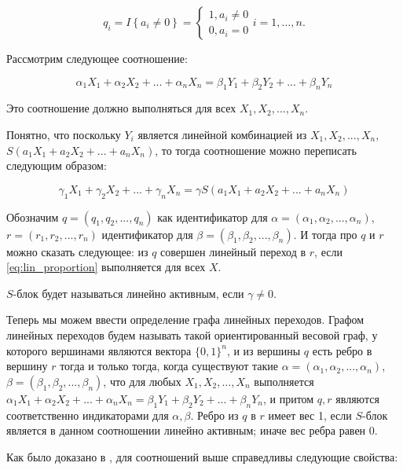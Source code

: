 \documentclass[a4paper,12pt]{report}
\theoremstyle{plain} %
\theoremstyle{definition}
\theoremstyle{remark}
\begin{document}
\begin{large}
\begin{equation}
q_i=I\left\{a_i\ne 0\right\}=\left\{ \begin{array}{c}
1,a_i \neq 0 \\
0,a_i = 0\end{array}
\right.i=1,\dots , n.
\end{equation}

Рассмотрим следующее соотношение:

\begin{equation}
\label{eq:lin_proportion}
\alpha_1X_1 + \alpha_2X_2 + ... + \alpha_nX_n = \beta_1Y_1 + \beta_2Y_2 + ... + \beta_nY_n
\end{equation}

Это соотношение должно выполняться для всех $X_1, X_2, ..., X_n$.

Понятно, что поскольку $Y_i$ является линейной комбинацией из $X_1, X_2, ..., X_n$, $S(a_1X_1 + a_2X_2 + ... + a_nX_n)$, то тогда соотношение можно переписать следующим образом:

\begin{equation}\label{eq:in_gamma}
\gamma_1X_1 + \gamma_2X_2 + ... + \gamma_nX_n = \gamma S(a_1X_1 + a_2X_2 + ... + a_nX_n)\end{equation}

Обозначим $q=(q_1, q_2, ..., q_n)$ как идентификатор для $\alpha=(\alpha_1, \alpha_2, ..., \alpha_n)$, $r=(r_1, r_2, ..., r_n)$ идентификатор для $\beta = (\beta_1, \beta_2, ..., \beta_n)$. И тогда про $q$ и $r$ можно сказать следующее: из $q$ совершен линейный переход в $r$, если \ref{eq:lin_proportion} выполняется для всех $X$. 

$S$-блок будет называться линейно активным, если $\gamma \neq 0$.

Теперь мы можем ввести определение графа линейных переходов. Графом линейных переходов будем называть такой ориентированный весовой граф, у которого вершинами являются вектора $\{0, 1\}^n$, и из вершины $q$ есть ребро в вершину $r$ тогда и только тогда, когда существуют такие $\alpha = (\alpha_1, \alpha_2, ..., \alpha_n)$, $\beta = (\beta_1, \beta_2, ..., \beta_n)$, что для любых $X_1, X_2, ..., X_n$ выполняется $\alpha_1X_1 + \alpha_2X_2 + ... + \alpha_nX_n = \beta_1Y_1 + \beta_2Y_2 + ... + \beta_nY_n$, и притом $q, r$ являются соответственно индикаторами для $\alpha, \beta$. Ребро из $q$ в $r$ имеет вес 1, если $S$-блок является в данном соотношении линейно активным; иначе вес ребра равен 0.

Как было доказано в \cite{marchuk}, для соотношений выше справедливы следующие свойства:


\end{large}
\end{document}
